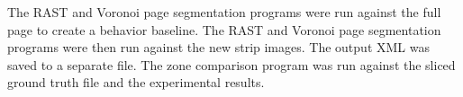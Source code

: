 \documentclass[conference]{IEEEtran}
\begin{document}
The \cite{winder2010extending} RAST and Voronoi page segmentation programs were
run against the full page to create a behavior baseline.  The RAST and Voronoi
page segmentation programs were then run against the new strip images. The output XML
was saved to a separate file. The \cite{winder2010extending} zone comparison
program was run against the sliced ground truth file and the experimental
results. 


%
\end{document}
